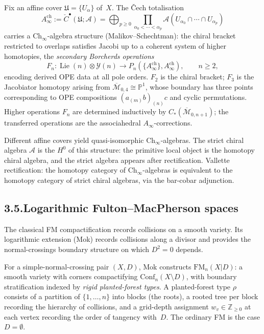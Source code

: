 \documentclass[11pt,reqno]{amsart}
\theoremstyle{definition}
\theoremstyle{remark}
\providecommand{\cA}{\mathcal{A}}
\providecommand{\cY}{\mathcal{Y}}
\numberwithin{equation}{section}
\begin{document}
Fix an affine cover $\mathfrak U=\{U_\alpha\}$ of~$X$. The \v Cech
totalisation
\[
A^{\mathrm{ch}}_\infty:=\check C^\bullet(\mathfrak U;\cA)=\bigoplus_{p\ge 0}\prod_{\alpha_0<\cdots<\alpha_p}\cA(U_{\alpha_0}\cap\cdots\cap U_{\alpha_p})
\]
carries a $\mathrm{Ch}_\infty$-algebra structure (Malikov--Schechtman):
the chiral bracket restricted to overlaps satisfies Jacobi up to a
coherent system of higher homotopies, the \emph{secondary Borcherds
operations}
\[
F_n\colon\operatorname{Lie}(n)\otimes\cY(n)\to P_n(\{A^{\mathrm{ch}}_\infty\},A^{\mathrm{ch}}_\infty),\qquad n\ge 2,
\]
encoding derived OPE data at all pole orders. $F_2$ is the chiral
bracket; $F_3$ is the Jacobiator homotopy arising from
$\overline{\mathcal M}_{0,4}\cong\mathbb P^1$, whose boundary has
three points corresponding to OPE compositions
$(a_{(m)}b)_{(n)}c$ and cyclic permutations. Higher operations $F_n$
are determined inductively by $C_*(\overline{\mathcal M}_{0,n+1})$;
the transferred operations are the associahedral $A_\infty$-corrections.

Different affine covers yield quasi-isomorphic $\mathrm{Ch}_\infty$-algebras.
The strict chiral algebra $\cA$ is the $H^0$ of this structure: the
primitive local object is the homotopy chiral algebra, and the strict
algebra appears after rectification. Vallette rectification: the
homotopy category of $\mathrm{Ch}_\infty$-algebras is equivalent to
the homotopy category of strict chiral algebras, via the bar-cobar
adjunction.

\subsection*{3.5.\enspace Logarithmic Fulton--MacPherson spaces}

The classical FM compactification records collisions on a smooth
variety. Its logarithmic extension (Mok) records collisions along a
divisor and provides the normal-crossings boundary structure on which
$D^2=0$ depends.

For a simple-normal-crossing pair $(X,D)$, Mok constructs
$\mathrm{FM}_n(X|D)$: a smooth variety with corners compactifying
$\mathrm{Conf}_n(X\setminus D)$, with boundary stratification indexed
by \emph{rigid planted-forest types}. A planted-forest type $\rho$
consists of a partition of $\{1,\ldots,n\}$ into blocks (the roots),
a rooted tree per block recording the hierarchy of collisions, and a
grid-depth assignment $w_v\in\mathbb Z_{\ge 0}$ at each vertex
recording the order of tangency with~$D$. The ordinary FM is the
case $D=\emptyset$.
\end{document}
